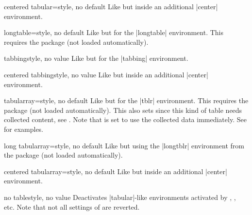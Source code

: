 \documentclass[a4paper,11pt]{ltxdoc}
\begin{document}
\begin{docCsvKey}{centered tabular}{=}{style, no default}
  Like  but inside an additional |center| environment.
\end{docCsvKey}


\begin{docCsvKey}{longtable}{=}{style, no default}
  Like  but for the |longtable| environment.
  This requires the package  (not loaded automatically).
\end{docCsvKey}


\begin{docCsvKey}{tabbing}{}{style, no value}
  Like  but for the |tabbing| environment.
\end{docCsvKey}


\begin{docCsvKey}{centered tabbing}{}{style, no value}
  Like  but inside an additional |center| environment.
\end{docCsvKey}


\begin{docCsvKey}[][doc new=2021-07-06]{tabularray}{=}{style, no default}
  Like  but for the |tblr| environment.
  This requires the package  (not loaded automatically).
  This also sets  since this kind of table
  needs collected content, see .
  Note that  is set to use the collected
  data immediately. See  for examples.
\end{docCsvKey}


\begin{docCsvKey}[][doc new=2021-07-23]{long tabularray}{=}{style, no default}
  Like  but using the |longtblr| environment
  from the package  (not loaded automatically).
\end{docCsvKey}


\begin{docCsvKey}[][doc new=2021-07-06]{centered tabularray}{=}{style, no default}
  Like  but inside an additional |center| environment.
\end{docCsvKey}


\begin{docCsvKey}{no table}{}{style, no value}
  Deactivates |tabular|-like environments activated by
  , , etc.
  Note that not all settings of  are reverted.
\end{docCsvKey}
\end{document}

